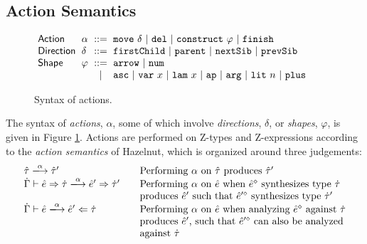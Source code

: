 \subsection{Action Semantics}\label{sec:actions}
\begin{figure}[t]
\hspace{-3px}$\arraycolsep=3pt\begin{array}{llcllll}
\mathsf{Action} & \alpha & ::= &
  \aMove{\delta} ~\vert~
  \aDel ~\vert~
  \aConstruct{\varphi} ~\vert~
  \aFinish\\
\mathsf{Direction} & \delta & ::= &
  \dChild ~\vert~
  \dParent ~\vert~
  \dNext ~\vert~
  \dPrev\\
\mathsf{Shape} & \varphi & ::= &
  \farr ~\vert~
  \fnum \\
& & \vert &
  \fasc ~\vert~
  \fvar{x} ~\vert~
  \flam{x} ~\vert~
  \fap ~\vert~
  \farg ~\vert~
  \fnumlit{n} ~\vert~
  \fplus
\end{array}$
\caption{Syntax of actions.}
\label{fig:action-syntax}
\vspace{-8px}
\end{figure}

The syntax of \emph{actions}, $\alpha$, some of which involve \emph{directions}, $\delta$, or \emph{shapes}, $\varphi$, is given in Figure \ref{fig:action-syntax}. Actions are performed on Z-types and Z-expressions according to the \emph{action semantics} of Hazelnut, which is organized around three judgements:
\[\arraycolsep=10pt\begin{array}{ll}
\performTyp{\ztau}{\alpha}{\ztau'} & \text{Performing $\alpha$ on $\ztau$ produces $\ztau'$}\\
\performSyn{\hGamma}{\zexp}{\htau}{\alpha}{\zexp'}{\htau'} & \text{Performing $\alpha$ on $\zexp$ when $\removeSel{\zexp}$ synthesizes type $\htau$}\\
& \text{produces $\zexp'$ such that $\removeSel{\zexp'}$ synthesizes type $\htau'$}\\
\performAna{\hGamma}{\zexp}{\htau}{\alpha}{\zexp'} & \text{Performing $\alpha$ on $\zexp$ when analyzing $\removeSel{\zexp}$ against $\htau$}\\
& \text{produces $\zexp'$, such that $\removeSel{\zexp'}$ can also be analyzed}\\
& \text{against $\htau$}
\end{array}\]

